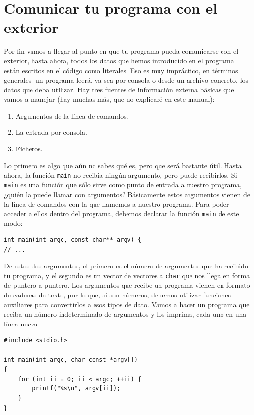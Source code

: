 \documentclass[a4paper]{article}
\begin{document}
\section{Comunicar tu programa con el exterior}
Por fin vamos a llegar al punto en que tu programa pueda comunicarse con el
exterior, hasta ahora, todos los datos que hemos introducido en el programa
están escritos en el código como literales. Eso es muy impráctico, en términos
generales, un programa leerá, ya sea por consola o desde un archivo concreto,
los datos que deba utilizar. Hay tres fuentes de información externa
básicas que vamos a manejar (hay muchas más, que no explicaré en este manual):
\begin{enumerate}
\item Argumentos de la línea de comandos.
\item La entrada por consola.
\item Ficheros.
\end{enumerate}

Lo primero es algo que aún no sabes qué es, pero que será bastante útil. Hasta
ahora, la función \verb!main! no recibía ningún argumento, pero puede
recibirlos. Si \verb!main! es una función que sólo sirve como punto de entrada
a nuestro programa, ¿quién la puede llamar con argumentos? Básicamente
estos argumentos vienen de la línea de comandos con la que llamemos a nuestro
programa. Para poder acceder a ellos dentro del programa, debemos declarar
la función \verb!main! de este modo:

\noindent
\begin{minipage}[H]{\linewidth}
\mbox{}
\begin{lstlisting}[style=C,
caption={Declaración de una función \texttt{main} que reciba argumentos},
label={lst:mainArguments}]
int main(int argc, const char** argv) {
// ...
\end{lstlisting}
\end{minipage}

De estos dos argumentos, el primero es el número de argumentos que ha recibido
tu programa, y el segundo es un vector de vectores a \verb!char! que nos llega
en forma de puntero a puntero. Los argumentos que recibe un programa vienen
en formato de cadenas de texto, por lo que, si son números, debemos utilizar
funciones auxiliares para convertirlos a esos tipos de dato. Vamos a hacer
un programa que reciba un número indeterminado de argumentos y los imprima, cada
uno en una línea nueva.

\noindent
\begin{minipage}[H]{\linewidth}
\mbox{}
\begin{lstlisting}[style=C,
caption={Utilización de los argumentos de un programa},
label={lst:argumentProgram}]
#include <stdio.h>

int main(int argc, char const *argv[])
{
    for (int ii = 0; ii < argc; ++ii) {
        printf("%s\n", argv[ii]);
    }
}
\end{lstlisting}
\end{minipage}
\end{document}
